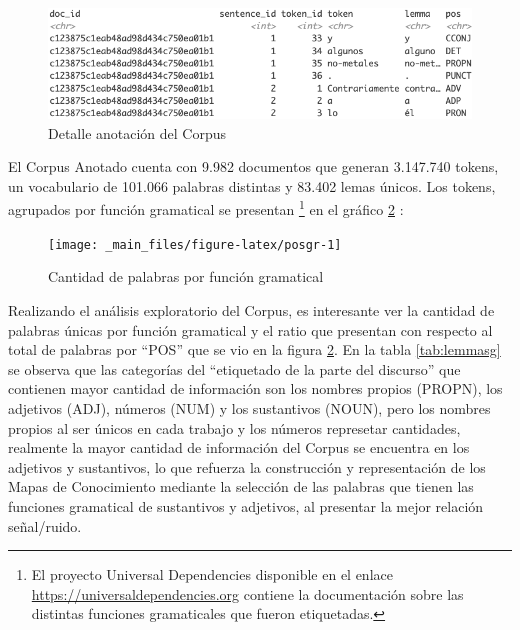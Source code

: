 \documentclass[
  12pt,
  openany]{book}
\begin{document}
\begin{figure}

{\centering \includegraphics[width=0.9\linewidth]{images/05-desarrollo/2_ciclo/nlp/corpusanotado2} 

}

\caption{Detalle anotación del Corpus}\label{fig:corpusano}
\end{figure}

El Corpus Anotado cuenta con 9.982 documentos que generan 3.147.740 tokens, un vocabulario de 101.066 palabras distintas y 83.402 lemas únicos. Los tokens, agrupados por función gramatical se presentan \footnote{El proyecto Universal Dependencies disponible en el enlace \url{https://universaldependencies.org} contiene la documentación sobre las distintas funciones gramaticales que fueron etiquetadas.} en el gráfico \ref{fig:posgr} :

\begin{figure}

{\centering \texttt{[image: \_main\_files/figure-latex/posgr-1]} 

}

\caption{Cantidad de palabras por función gramatical}\label{fig:posgr}
\end{figure}

Realizando el análisis exploratorio del Corpus, es interesante ver la cantidad de palabras únicas por función gramatical y el ratio que presentan con respecto al total de palabras por ``POS'' que se vio en la figura \ref{fig:posgr}. En la tabla \ref{tab:lemmasg} se observa que las categorías del ``etiquetado de la parte del discurso'' que contienen mayor cantidad de información son los nombres propios (PROPN), los adjetivos (ADJ), números (NUM) y los sustantivos (NOUN), pero los nombres propios al ser únicos en cada trabajo y los números represetar cantidades, realmente la mayor cantidad de información del Corpus se encuentra en los adjetivos y sustantivos, lo que refuerza la construcción y representación de los Mapas de Conocimiento mediante la selección de las palabras que tienen las funciones gramatical de sustantivos y adjetivos, al presentar la mejor relación señal/ruido.
\end{document}
